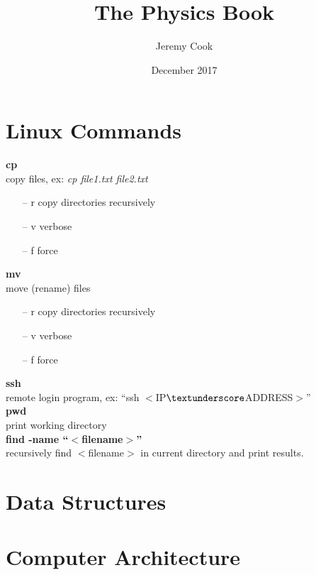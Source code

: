 \documentclass{article}
\title{The Physics Book}
\author{Jeremy Cook}
\date{December 2017}
\begin{document}
\maketitle

\tableofcontents

\newpage
\section{Linux Commands}

\noindent \textbf{cp} \\
\indent copy files, ex: \textit{cp file1.txt file2.txt}
\begin{itemize}
    \item[--]r \quad copy directories recursively
    \item[--]v \quad verbose
    \item[--]f \quad force
\end{itemize}

\noindent \textbf{mv} \\
\indent move (rename) files
\begin{itemize}
    \item[--]r \quad copy directories recursively
    \item[--]v \quad verbose
    \item[--]f \quad force
\end{itemize}

\noindent \textbf{ssh} \\
\indent remote login program, ex: ``ssh $<$IP$\textunderscore$ADDRESS$>$''
\\

\noindent \textbf{pwd} \\
\indent print working directory
\\

\noindent \textbf{find -name ``$<$filename$>$''} \\
\indent recursively find $<$filename$>$ in current directory and print results.
\\


\newpage
\section{Data Structures}

\newpage
\section{Computer Architecture}
\end{document}
